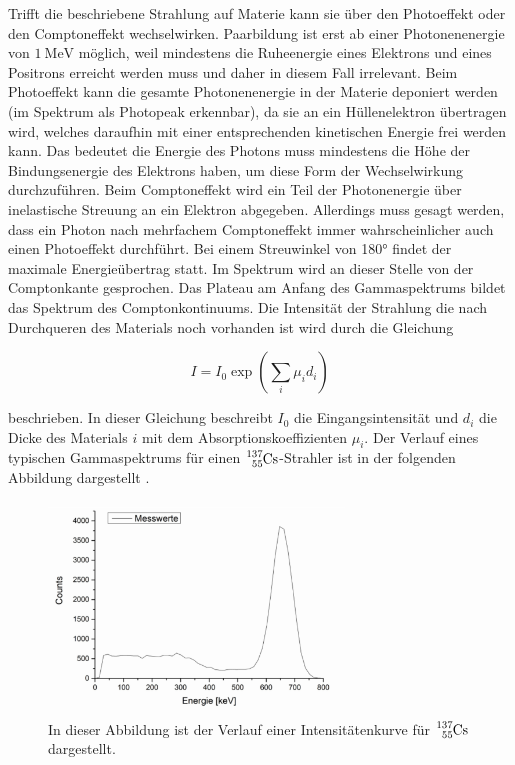 Trifft die beschriebene Strahlung auf Materie kann sie über den Photoeffekt oder den 
Comptoneffekt wechselwirken. Paarbildung ist erst ab einer Photonenenergie von 
$\SI{1}{\mega\eV}$ möglich, weil mindestens die Ruheenergie eines Elektrons und eines 
Positrons erreicht werden muss und daher in diesem Fall irrelevant.
Beim Photoeffekt kann die gesamte Photonenenergie in der Materie deponiert werden
(im Spektrum als Photopeak erkennbar), 
da sie an ein Hüllenelektron übertragen wird, welches daraufhin mit einer 
entsprechenden kinetischen Energie frei werden kann. Das bedeutet die Energie des Photons 
muss mindestens die Höhe der Bindungsenergie des Elektrons haben, um diese Form der 
Wechselwirkung durchzuführen. Beim Comptoneffekt wird ein Teil der 
Photonenergie über inelastische Streuung an ein Elektron abgegeben.
Allerdings muss gesagt werden, dass ein Photon nach mehrfachem Comptoneffekt immer 
wahrscheinlicher auch einen Photoeffekt durchführt. Bei einem 
Streuwinkel von 180° findet der maximale Energieübertrag statt. Im Spektrum wird an 
dieser Stelle von der Comptonkante gesprochen. 
Das Plateau am Anfang des Gammaspektrums bildet das Spektrum des 
Comptonkontinuums. Die Intensität der Strahlung die 
nach Durchqueren des Materials noch vorhanden ist wird durch die Gleichung 

\begin{equation}
	I = I_0 \exp \left( \sum_i \mu_i d_i \right)
	\label{eq1}
\end{equation}

beschrieben. In dieser Gleichung beschreibt $I_0$ die Eingangsintensität und $d_i$ die 
Dicke des Materials $i$ mit dem Absorptionskoeffizienten $\mu_{i}$. Der 
Verlauf eines typischen Gammaspektrums für einen 
$\ce{^137_55Cs}$-Strahler ist in der folgenden Abbildung dargestellt \cite{Kerne}.

\begin{figure}
	\centering
	\includegraphics[width=0.7\textwidth]{figure/Kurve.pdf}
	\caption{In dieser Abbildung ist der Verlauf einer Intensitätenkurve für 
	$\ce{^137_55Cs}$ dargestellt.}
	\label{abbkurve}
\end{figure}
\FloatBarrier

